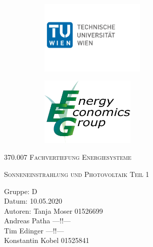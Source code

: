 \documentclass[a4paper,12pt]{article}
\begin{document}
	\begin{titlepage}
		\begin{figure}[h]
			\begin{subfigure}{1cm}
				\includegraphics[width=5cm]{img/TU_Logo}
			\end{subfigure}
			\hspace{10cm}
			\begin{subfigure}{6cm}
				\includegraphics[width=4.5cm]{img/EEG_logo}
			\end{subfigure}
		\end{figure}
		\centering
		\bigskip \bigskip \bigskip \bigskip \bigskip
		\scshape\LARGE 370.007 Fachvertiefung Energiesysteme\par
		\vspace{1cm}
		\scshape\large Sonneneinstrahlung und Photovoltaik Teil 1 \par
		\vspace{8cm}
		\raggedright
		\large Gruppe: D \\
		Datum: 10.05.2020 \\
		Autoren: Tanja Moser 01526699\\
		\hspace{2.4cm} Andreas Patha ---!!---\\
		\hspace{2.4cm} Tim Edinger ---!!---\\
		\hspace{2.4cm} Konstantin Kobel 01525841\\
		\vfill
		\large \par
	\end{titlepage}
\end{document}
